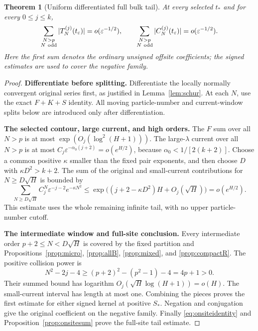 \documentclass[11pt]{article}
\numberwithin{equation}{section}
\newtheorem{theorem}{Theorem}[section]
\theoremstyle{definition}
\newcommand{\eps}{\varepsilon}
\begin{document}
\begin{theorem}[Uniform differentiated full bulk tail]\label{thm:tail}
At every selected $t_*$ and for every $0\le j\le k$,
\[
 \sum_{\substack{N>p\\N\ {\rm odd}}}|T_N^{(j)}(t_\eps)|
 =o(\eps^{-1/2}),\qquad
 \sum_{\substack{N>p\\N\ {\rm odd}}}|C_N^{(j)}(t_\eps)|
 =o(\eps^{-1/2}).
\]
Here the first sum denotes the ordinary unsigned offsite coefficients;
the signed estimates are used to cover the negative family.
\end{theorem}
\begin{proof}
\noindent\textbf{Differentiate before splitting.} Differentiate the locally normally convergent original series first,
as justified in Lemma~\ref{lem:schur}. At each $N$, use the exact
$F+K+S$ identity. All moving particle-number and current-window
splits below are introduced only after differentiation.

\par\smallskip\noindent\textbf{The selected contour, large current, and high orders.} The $F$ sum over all $N>p$ is at most
$\exp(O_j(\log^2(H+1)))$. The large-$\lambda$ current over all
$N>p$ is at most $C_j\eps^{-\alpha_0(j+2)}=o(e^{H/2})$,
because $\alpha_0<1/[2(k+2)]$.
Choose a common positive $\kappa$ smaller than the fixed pair
exponents, and then choose $D$ with $\kappa D^2>k+2$.
The sum of the original and small-current contributions for
$N\ge D\sqrt H$ is bounded by
\[
 \sum_{N\ge D\sqrt H}C_j^N\eps^{-j-2}e^{-\kappa N^2}
 \le \exp\bigl((j+2-\kappa D^2)H+O_j(\sqrt H)\bigr)
 =o(e^{H/2}).
\]
This estimate uses the whole remaining infinite tail, with no
upper particle-number cutoff.

\par\smallskip\noindent\textbf{The intermediate window and full-site conclusion.} Every intermediate order $p+2\le N<D\sqrt H$ is covered by the
fixed partition and Propositions~\ref{prop:micro}, \ref{prop:allB},
\ref{prop:mixed}, and \ref{prop:compactR}. The positive collision
power is
\[
 N^2-2j-4\ge(p+2)^2-(p^2-1)-4=4p+1>0.
\]
Their summed bound has logarithm
$O_j(\sqrt H\log(H+1))=o(H)$. The small-current interval has
length at most one. Combining the pieces proves the first estimate
for either signed kernel at positive $S_*$. Negation and
conjugation give the original coefficient on the negative family.
Finally \eqref{eq:onsiteidentity} and
Proposition~\ref{prop:onsitesum} prove the full-site tail estimate.
\end{proof}
\end{document}
